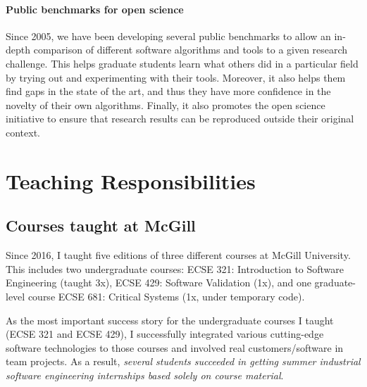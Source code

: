 \paragraph{Public benchmarks for open science}
Since 2005, we have been developing several public benchmarks to allow an in-depth comparison of different software algorithms and tools to a given research challenge. This helps graduate students learn what others did in a particular field by trying out and experimenting with their tools. Moreover, it also helps them find gaps in the state of the art, and thus they have more confidence in the novelty of their own algorithms. Finally, it also promotes the open science initiative to ensure that research results can be reproduced outside their original context.








\section{Teaching Responsibilities}
\label{sec:teaching-responsibilities}

\subsection{Courses taught at McGill}
Since 2016, I taught five editions of three different courses at McGill University. This includes two undergraduate courses: ECSE 321: Introduction to Software Engineering (taught 3x), ECSE 429: Software Validation (1x), and one graduate-level course ECSE 681: Critical Systems (1x, under temporary code). 

As the most important success story for the undergraduate courses I taught (ECSE 321 and ECSE 429), I successfully integrated various cutting-edge software technologies to those courses and involved real customers/software in team projects. As a result, \emph{several students succeeded in getting summer industrial software engineering internships based solely on course material}. 

